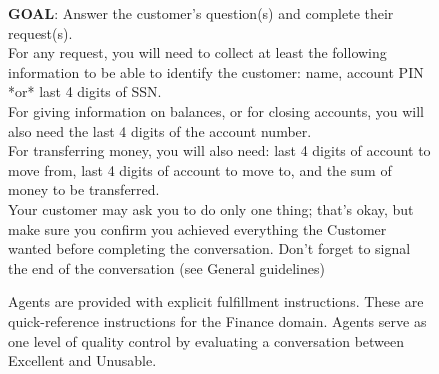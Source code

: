 {{\begin{figure}[t!]
{\begin{minipage}{35em}
			\textbf{GOAL}: Answer the customer's question(s) and complete their request(s). \\
			
			For any request, you will need to collect at least the following information to be able to identify the customer: name, account PIN *or* last 4 digits of SSN. \\
			
			For giving information on balances, or for closing accounts, you will also need the last 4 digits of the account number. \\
			
			For transferring money, you will also need: last 4 digits of account to move from, last 4 digits of account to move to, and the sum of money to be transferred. \\
			
			Your customer may ask you to do only one thing; that's okay, but make sure you confirm you achieved everything the Customer wanted before completing the conversation.
			Don't forget to signal the end of the conversation (see General guidelines)
	\end{minipage}}
	\caption{Agents are provided with explicit fulfillment instructions. These are quick-reference instructions for the Finance domain. Agents serve as one level of quality control by evaluating a conversation between Excellent and Unusable.}  %
	\label{Instructions}
\end{figure}

	\begin{table*}[t!]
	\footnotesize
	\centering
	\begin{tabular}{ c c  c c c  c c c  c c c }
		

\end{tabular}
\end{table*}}}
